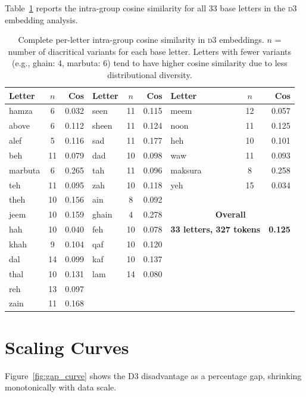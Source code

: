 \documentclass[11pt]{article}
\newcommand{\dThree}{\textsc{d3}}
\begin{document}
Table~\ref{tab:full_cosine} reports the intra-group cosine similarity for all 33 base letters in the \dThree{} embedding analysis.

\begin{table}[t]
\centering
\small
\begin{tabular}{@{}lcr|lcr|lcr@{}}
\toprule
\textbf{Letter} & \textbf{$n$} & \textbf{Cos} & \textbf{Letter} & \textbf{$n$} & \textbf{Cos} & \textbf{Letter} & \textbf{$n$} & \textbf{Cos} \\
\midrule
hamza & 6 & 0.032 & seen & 11 & 0.115 & meem & 12 & 0.057 \\
above & 6 & 0.112 & sheen & 11 & 0.124 & noon & 11 & 0.125 \\
alef & 5 & 0.116 & sad & 11 & 0.177 & heh & 10 & 0.101 \\
beh & 11 & 0.079 & dad & 10 & 0.098 & waw & 11 & 0.093 \\
marbuta & 6 & 0.265 & tah & 11 & 0.096 & maksura & 8 & 0.258 \\
teh & 11 & 0.095 & zah & 10 & 0.118 & yeh & 15 & 0.034 \\
theh & 10 & 0.156 & ain & 8 & 0.092 &  &  & \\
jeem & 10 & 0.159 & ghain & 4 & 0.278 & \multicolumn{3}{c}{\textbf{Overall}} \\
hah & 10 & 0.040 & feh & 10 & 0.078 & \multicolumn{2}{l}{\textbf{33 letters, 327 tokens}} & \textbf{0.125} \\
khah & 9 & 0.104 & qaf & 10 & 0.120 & & & \\
dal & 14 & 0.099 & kaf & 10 & 0.137 & & & \\
thal & 10 & 0.131 & lam & 14 & 0.080 & & & \\
reh & 13 & 0.097 & & & & & & \\
zain & 11 & 0.168 & & & & & & \\
\bottomrule
\end{tabular}
\caption{Complete per-letter intra-group cosine similarity in \dThree{} embeddings. $n$ = number of diacritical variants for each base letter. Letters with fewer variants (e.g., ghain: 4, marbuta: 6) tend to have higher cosine similarity due to less distributional diversity.}
\label{tab:full_cosine}
\end{table}

\section{Scaling Curves}
\label{app:scaling}

Figure~\ref{fig:gap_curve} shows the D3 disadvantage as a percentage gap, shrinking monotonically with data scale.
\end{document}
